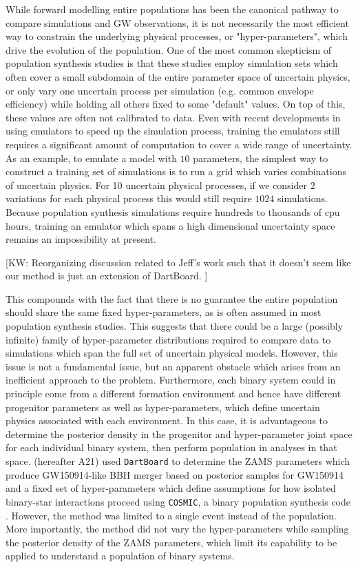 \documentclass[twocolumn]{aastex631}
\newcommand{\kw}[1]{{\color{rb4}[KW: #1 ]}}
\begin{document}
While forward modelling entire populations has been the canonical pathway to compare simulations and GW observations,
it is not necessarily the most efficient way to constrain the underlying physical processes, or "hyper-parameters", which drive the evolution of the population.
One of the most common skepticism of population synthesis studies is that these studies employ simulation sets which often 
cover a small subdomain of the entire parameter space of uncertain physics, or only vary one uncertain process per simulation
(e.g. common envelope efficiency) while holding all others fixed to some "default" values.
On top of this, these values are often not calibrated to data.
Even with recent developments in using emulators to speed up the simulation process, training the emulators 
still requires a significant amount of computation to cover a wide range of uncertainty.
As an example, to emulate a model with $10$ parameters, the simplest way to construct a training set of simulations is to 
run a grid which varies combinations of uncertain physics.
For 10 uncertain physical processes, if we consider $2$ variations for each physical process 
this would still require $1024$ simulations.
Because population synthesis simulations require hundreds to thousands of cpu hours,
training an emulator which spans a high dimensional uncertainty space remains an impossibility at present.

\kw{Reorganizing discussion related to Jeff's work such that it doesn't seem like our method is just an extension of DartBoard.}

This compounds with the fact that there is no guarantee the entire population should share the same fixed hyper-parameters, 
as is often assumed in most population synthesis studies.
This suggests that there could be a large (possibly infinite) family of hyper-parameter distributions 
required to compare data to simulations which span the full set of uncertain physical models.
However, this issue is not a fundamental issue, but an apparent obstacle which arises from an inefficient approach to the problem.
Furthermore, each binary system could in principle come from a different formation environment and hence 
have different progenitor parameters as well as hyper-parameters, which define uncertain physics associated with each environment.
In this case, it is advantageous to determine the posterior density in the progenitor and hyper-parameter joint space 
for each individual binary system, then perform population in analyses in that space.
\citet{Andrews2021} (hereafter A21) used \texttt{DartBoard} \citep{Andrews2018} 
to determine the ZAMS parameters which produce GW150914-like BBH merger based on posterior samples for GW150914 and a fixed 
set of hyper-parameters which define assumptions for how isolated binary-star interactions proceed using 
\texttt{COSMIC}, a binary population synthesis code \citep{Breivik2020}.
However, the method was limited to a single event instead of the population.
More importantly, the method did not vary the hyper-parameters while sampling the posterior density of the ZAMS parameters,
which limit its capability to be applied to understand a population of binary systems.
\end{document}
